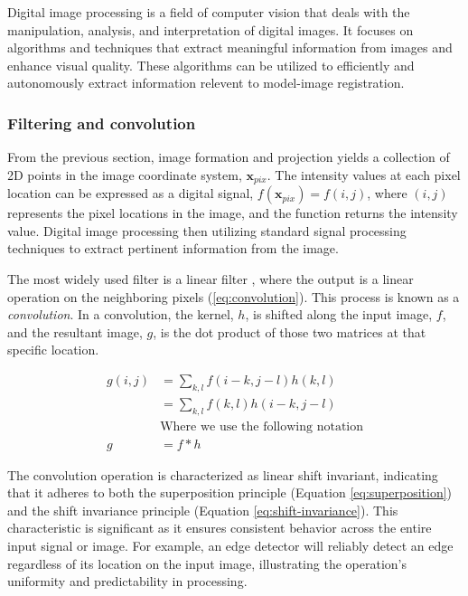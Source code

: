 Digital image processing is a field of computer vision that deals with the manipulation, analysis, and interpretation of digital images.
It focuses on algorithms and techniques that extract meaningful information from images and enhance visual quality.
These algorithms can be utilized to efficiently and autonomously extract information relevent to model-image registration.

\subsubsection{Filtering and convolution}
\label{sec:filtering-convolution}
From the previous section, image formation and projection yields a collection of 2D points in the image coordinate system, $\mathbf{x}_{pix}$.
The intensity values at each pixel location can be expressed as a digital signal, $f(\mathbf{x}_{pix}) = f(i,j)$, where $(i,j)$ represents the pixel locations in the image, and the function returns the intensity value.
Digital image processing then utilizing standard signal processing techniques to extract pertinent information from the image.

The most widely used filter is a linear filter \cite{szeliskiComputerVisionAlgorithms2022}, where the output is a linear operation on the neighboring pixels (\cref{eq:convolution}).
This process is known as a \emph{convolution}.
In a convolution, the kernel, $h$, is shifted along the input image, $f$, and the resultant image, $g$, is the dot product of those two matrices at that specific location.

\begin{equation}
    \begin{aligned}
        g(i,j) &= \sum_{k,l}f(i-k,j-l)h(k,l) \\
        &= \sum_{k,l}f(k,l)h(i-k,j-l) \\
        &\text{Where we use the following notation}\\
        g&= f * h
    \end{aligned}
    \label{eq:convolution}
\end{equation}

The convolution operation is characterized as linear shift invariant, indicating that it adheres to both the superposition principle (Equation \ref{eq:superposition}) and the shift invariance principle (Equation \ref{eq:shift-invariance}).
This characteristic is significant as it ensures consistent behavior across the entire input signal or image.
For example, an edge detector will reliably detect an edge regardless of its location on the input image, illustrating the operation's uniformity and predictability in processing.

